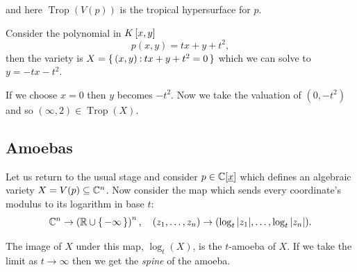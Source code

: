 \documentclass[12pt]{memoir}
\DeclareMathOperator{\Trop}{Trop}
\begin{document}
and here $\Trop(V(p))$ is the tropical hypersurface for $p$.
\begin{Ex}
    Consider the polynomial in $K\left\lbrack x,y\right\rbrack$ 
    $$p(x,y)=tx+y+t^2,$$
    then the variety is $X=\{\,(x,y)\mathbin{:} tx+y+t^2=0\,\}$ which we can solve to $y=-tx-t^2$.\par 
    If we choose $x=0$ then $y$ becomes $-t^2$. Now we take the valuation of $(0,-t^2)$ and so $(\infty,2)\in\Trop(X)$.
\end{Ex}

\subsection{Amoebas}

Let us return to the usual stage and consider $p\in\mathbb{C}[\underline x]$ which defines an algebraic variety $X=V(p)\subseteq\mathbb{C}^n$. Now consider the map which sends every coordinate's modulus to its logarithm in base $t$: 
$$\mathbb{C}^n\to\left(\mathbb{R}\cup\{\,-\infty\,\}\right)^n,\quad (z_1,\dots,z_n)\to(\log_t|z_1|,\dots,\log_t|z_n|).$$


The image of $X$ under this map, $\log_t(X)$, is the $t$-amoeba of $X$. If we take the limit as $t\to\infty$ then we get the \emph{spine} of the amoeba. 
\end{document}
